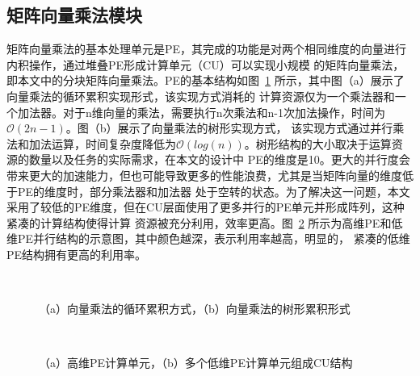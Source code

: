 \subsection{矩阵向量乘法模块}
矩阵向量乘法的基本处理单元是PE，其完成的功能是对两个相同维度的向量进行内积操作，通过堆叠PE形成计算单元（CU）可以实现小规模
的矩阵向量乘法，即本文中的分块矩阵向量乘法。PE的基本结构如图~\ref{fig:MVM} 所示，其中图（a）展示了向量乘法的循环累积实现形式，该实现方式消耗的
计算资源仅为一个乘法器和一个加法器。对于n维向量的乘法，需要执行n次乘法和n-1次加法操作，时间为\(\mathcal{O}(2n-1)\)。图（b）展示了向量乘法的树形实现方式，
该实现方式通过并行乘法和加法运算，时间复杂度降低为\(\mathcal{O}(log(n))\)。树形结构的大小取决于运算资源的数量以及任务的实际需求，在本文的设计中
PE的维度是10。更大的并行度会带来更大的加速能力，但也可能导致更多的性能浪费，尤其是当矩阵向量的维度低于PE的维度时，部分乘法器和加法器
处于空转的状态。为了解决这一问题，本文采用了较低的PE维度，但在CU层面使用了更多并行的PE单元并形成阵列，这种紧凑的计算结构使得计算
资源被充分利用，效率更高。图~\ref{fig:MVM_long} 所示为高维PE和低维PE并行结构的示意图，其中颜色越深，表示利用率越高，明显的，
紧凑的低维PE结构拥有更高的利用率。
\begin{figure}[htbp]
	\centering
			\\
	\caption{（a）向量乘法的循环累积方式，（b）向量乘法的树形累积形式}
\label{fig:MVM}
\end{figure}
\begin{figure}[htbp]
	\centering
			\\
	\caption{（a）高维PE计算单元，（b）多个低维PE计算单元组成CU结构}
\label{fig:MVM_long}
\end{figure}


